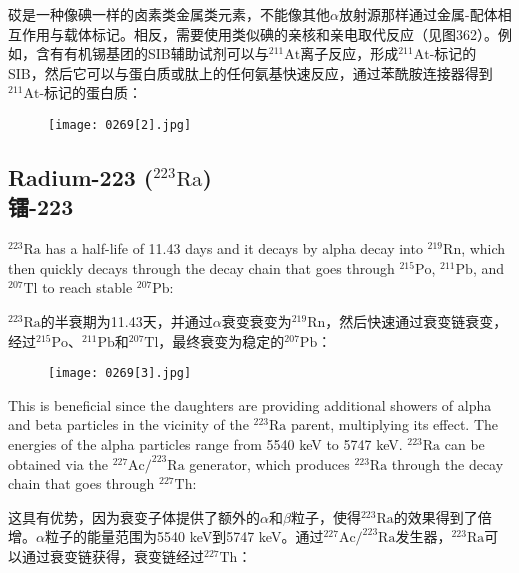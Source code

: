 \documentclass[dvipsnames, svgnames,a4paper,11pt]{article}
\begin{document}
砹是一种像碘一样的卤素类金属类元素，不能像其他$\alpha$放射源那样通过金属-配体相互作用与载体标记。相反，需要使用类似碘的亲核和亲电取代反应（见图362）。例如，含有有机锡基团的SIB辅助试剂可以与\(\mathrm{^{211}At}\)离子反应，形成\(\mathrm{^{211}At}\)-标记的SIB，然后它可以与蛋白质或肽上的任何氨基快速反应，通过苯酰胺连接器得到\(\mathrm{^{211}At}\)-标记的蛋白质：

\begin{figure}[h]
	\centering
    \texttt{[image: 0269[2].jpg]}  
     \label{fig362}
\end{figure}

\subsection{Radium-223 (\(\mathrm{^{223}Ra}\)) \\镭-223}  
\(\mathrm{^{223}Ra}\) has a half-life of 11.43 days and it decays by alpha decay into \(\mathrm{^{219}Rn}\), which then quickly decays through the decay chain that goes through \(\mathrm{^{215}Po}\), \(\mathrm{^{211}Pb}\), and \(\mathrm{^{207}Tl}\) to reach stable \(\mathrm{^{207}Pb}\):

\(\mathrm{^{223}Ra}\)的半衰期为11.43天，并通过$\alpha$衰变衰变为\(\mathrm{^{219}Rn}\)，然后快速通过衰变链衰变，经过\(\mathrm{^{215}Po}\)、\(\mathrm{^{211}Pb}\)和\(\mathrm{^{207}Tl}\)，最终衰变为稳定的\(\mathrm{^{207}Pb}\)：

\begin{figure}[h]
	\centering
    \texttt{[image: 0269[3].jpg]}  
     \label{fig363}
\end{figure}


This is beneficial since the daughters are providing additional showers of alpha and beta particles in the vicinity of the \(\mathrm{^{223}Ra}\) parent, multiplying its effect. The energies of the alpha particles range from 5540 keV to 5747 keV. \(\mathrm{^{223}Ra}\) can be obtained via the \(\mathrm{^{227}Ac/^{223}Ra}\) generator, which produces \(\mathrm{^{223}Ra}\) through the decay chain that goes through \(\mathrm{^{227}Th}\):

这具有优势，因为衰变子体提供了额外的$\alpha$和$\beta$粒子，使得\(\mathrm{^{223}Ra}\)的效果得到了倍增。$\alpha$粒子的能量范围为5540 keV到5747 keV。通过\(\mathrm{^{227}Ac/^{223}Ra}\)发生器，\(\mathrm{^{223}Ra}\)可以通过衰变链获得，衰变链经过\(\mathrm{^{227}Th}\)：
\end{document}
